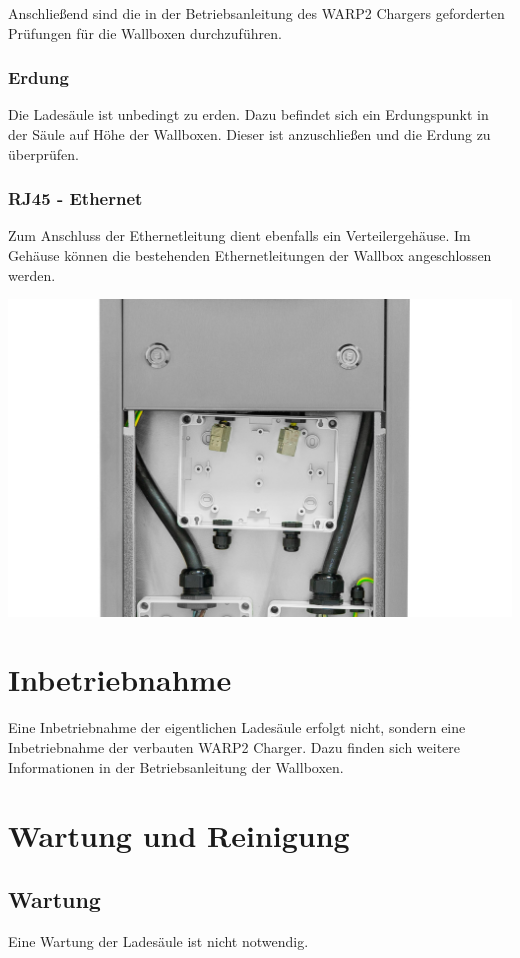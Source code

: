 \documentclass[a4paper,10pt]{article}
\begin{document}
\begin{multicols*}{2}
	Anschließend sind die in der Betriebsanleitung des WARP2 Chargers geforderten Prüfungen für die
	Wallboxen durchzuführen.

	\subsubsection{Erdung}
	Die Ladesäule ist unbedingt zu erden. Dazu befindet sich ein Erdungspunkt in
	der Säule auf Höhe der Wallboxen. Dieser ist anzuschließen und die Erdung zu
	überprüfen.

	\subsubsection{RJ45 - Ethernet}
	Zum Anschluss der Ethernetleitung dient ebenfalls ein Verteilergehäuse.
	Im Gehäuse können die bestehenden Ethernetleitungen der Wallbox
	angeschlossen werden.

	\begin{center}
		\includegraphics[width=\linewidth]{./img/warp-charger-stand-eth}
	\end{center}

	\section{Inbetriebnahme}
	Eine Inbetriebnahme der eigentlichen Ladesäule erfolgt nicht, sondern eine 
	Inbetriebnahme der verbauten WARP2 Charger. Dazu finden sich weitere Informationen in der
	Betriebsanleitung der Wallboxen.

	\section{Wartung und Reinigung}
	\subsection{Wartung}
	Eine Wartung der Ladesäule ist nicht notwendig.


\end{multicols*}
\end{document}
